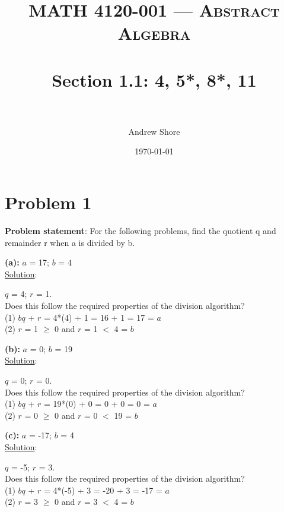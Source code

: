 \documentclass{article} %
\title{ 
\normalfont \normalsize 
\textsc{MATH 4120-001 --- Abstract Algebra} \\
\horrule{0.5pt} \\[0cm] %
\huge Section 1.1: 4, 5*, 8*, 11 \\ %
\horrule{2pt} \\[0cm] %
}
\author{Andrew Shore} %
\date{\normalsize\today} %
\begin{document}
\maketitle %

\section*{Problem 1}
\textbf{Problem statement}: 
For the following problems, find the quotient q and remainder r when a is divided by b. 
\\


\begin{addmargin}[1em]{0em}
\textbf{(a):} $a$ = 17; $b$ = 4 \\
\underline{Solution}: 
\begin{addmargin}[1em]{0em}
$q$ = 4; $r$ = 1. \\
Does this follow the required properties of the division algorithm? \\
(1) $bq$ + $r$ = 4*(4) + 1 = 16 + 1 = 17 = $a$ \checkmark\\
(2) $r$ = 1 $\geq$ 0 and $r$ = 1 $<$ 4 = $b$ \checkmark
\end{addmargin} 
\hfill \break
\textbf{(b):} $a$ = 0; $b$ = 19 \\
\underline{Solution}: 
\begin{addmargin}[1em]{0em}
$q$ = 0; $r$ = 0. \\
Does this follow the required properties of the division algorithm? \\
(1) $bq$ + $r$ = 19*(0) + 0 = 0 + 0 = 0 = $a$ \checkmark\\
(2) $r$ = 0 $\geq$ 0 and $r$ = 0 $<$ 19 = $b$ \checkmark
\end{addmargin} 
\hfill \break
\textbf{(c):} $a$ = -17; $b$ = 4 \\
\underline{Solution}: 
\begin{addmargin}[1em]{0em}
$q$ = -5; $r$ = 3. \\
Does this follow the required properties of the division algorithm? \\
(1) $bq$ + $r$ = 4*(-5) + 3 = -20 + 3 = -17 = $a$ \checkmark\\
(2) $r$ = 3 $\geq$ 0 and $r$ = 3 $<$ 4 = $b$ \checkmark
\end{addmargin} 
\end{addmargin}  
\end{document}
